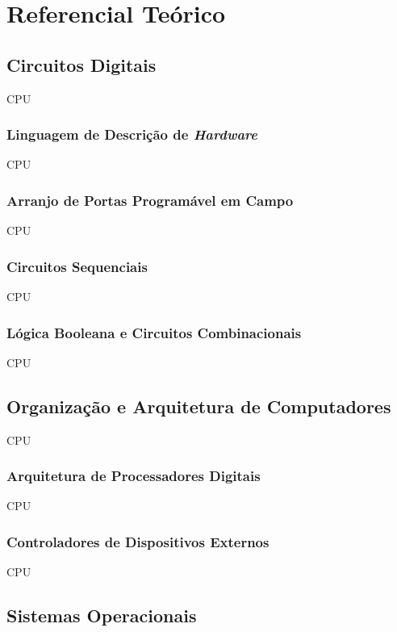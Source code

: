 
\chapter{Referencial Teórico}

\section{Circuitos Digitais}

CPU

\subsection{Linguagem de Descrição de \textit{Hardware}}

CPU

\subsection{Arranjo de Portas Programável em Campo}

CPU

\subsection{Circuitos Sequenciais}

CPU

\subsection{Lógica Booleana e Circuitos Combinacionais}

CPU

\section{Organização e Arquitetura de Computadores}

CPU

\subsection{Arquitetura de Processadores Digitais}

CPU

\subsection{Controladores de Dispositivos Externos}

CPU

\section{Sistemas Operacionais}

